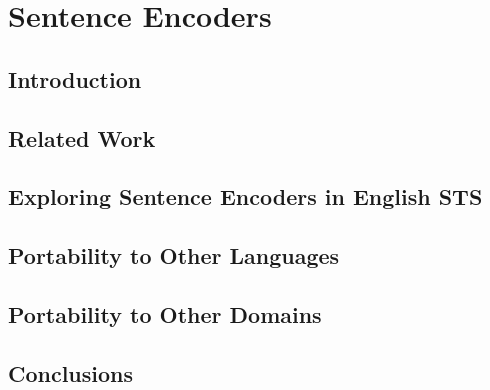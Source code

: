 \chapter{\label{cha:sts_sentence_encoders}Sentence Encoders}

\section{Introduction}
\cite{conneau-EtAl:2017:EMNLP2017}
\section{Related Work}

\section{Exploring Sentence Encoders in English STS}

\section{Portability to Other Languages}

\section{Portability to Other Domains}

\section{Conclusions}